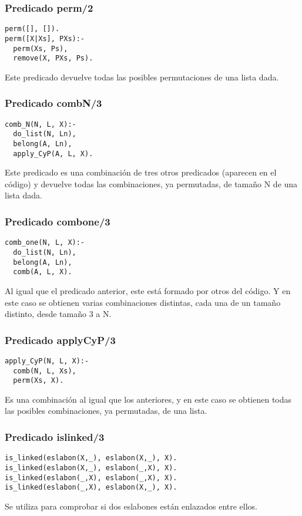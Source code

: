 \documentclass[11pt, a4paper]{article}
\begin{document}
\subsubsection{Predicado perm/2}
\begin{lstlisting}[frame=single]
perm([], []).
perm([X|Xs], PXs):-
  perm(Xs, Ps),
  remove(X, PXs, Ps).
\end{lstlisting}
Este predicado devuelve todas las posibles permutaciones de una lista dada.
\subsubsection{Predicado combN/3}
\begin{lstlisting}[frame=single]
comb_N(N, L, X):-
  do_list(N, Ln),
  belong(A, Ln),
  apply_CyP(A, L, X).
\end{lstlisting}
Este predicado es una combinación de tres otros predicados (aparecen en el código) y devuelve todas las combinaciones, ya permutadas, de tamaño N de una lista dada.
\subsubsection{Predicado combone/3}
\begin{lstlisting}[frame=single]
comb_one(N, L, X):-
  do_list(N, Ln),
  belong(A, Ln),
  comb(A, L, X).
\end{lstlisting}
Al igual que el predicado anterior, este está formado por otros del código. Y en este caso se obtienen varias combinaciones distintas, cada una de un tamaño distinto, desde tamaño 3 a N.
\subsubsection{Predicado applyCyP/3}
\begin{lstlisting}[frame=single]
apply_CyP(N, L, X):-
  comb(N, L, Xs),
  perm(Xs, X).
\end{lstlisting}
Es una combinación al igual que los anteriores, y en este caso se obtienen todas las posibles combinaciones, ya permutadas, de una lista.
\subsubsection{Predicado islinked/3}
\begin{lstlisting}[frame=single]
is_linked(eslabon(X,_), eslabon(X,_), X).
is_linked(eslabon(X,_), eslabon(_,X), X).
is_linked(eslabon(_,X), eslabon(_,X), X).
is_linked(eslabon(_,X), eslabon(X,_), X).
\end{lstlisting}
Se utiliza para comprobar si dos eslabones están enlazados entre ellos.
\end{document}
